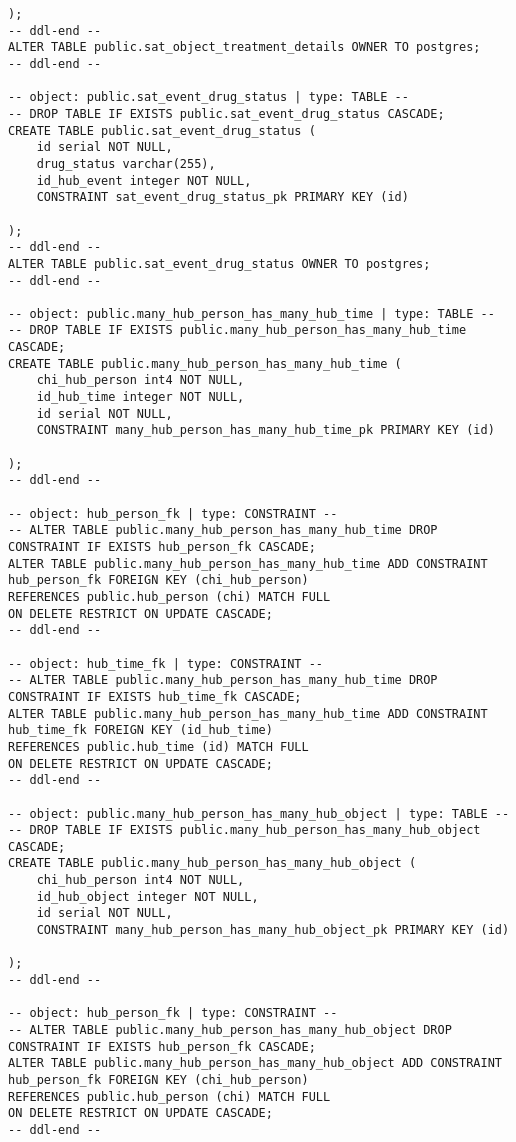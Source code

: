 \begin{lstlisting}
);
-- ddl-end --
ALTER TABLE public.sat_object_treatment_details OWNER TO postgres;
-- ddl-end --

-- object: public.sat_event_drug_status | type: TABLE --
-- DROP TABLE IF EXISTS public.sat_event_drug_status CASCADE;
CREATE TABLE public.sat_event_drug_status (
	id serial NOT NULL,
	drug_status varchar(255),
	id_hub_event integer NOT NULL,
	CONSTRAINT sat_event_drug_status_pk PRIMARY KEY (id)

);
-- ddl-end --
ALTER TABLE public.sat_event_drug_status OWNER TO postgres;
-- ddl-end --

-- object: public.many_hub_person_has_many_hub_time | type: TABLE --
-- DROP TABLE IF EXISTS public.many_hub_person_has_many_hub_time CASCADE;
CREATE TABLE public.many_hub_person_has_many_hub_time (
	chi_hub_person int4 NOT NULL,
	id_hub_time integer NOT NULL,
	id serial NOT NULL,
	CONSTRAINT many_hub_person_has_many_hub_time_pk PRIMARY KEY (id)

);
-- ddl-end --

-- object: hub_person_fk | type: CONSTRAINT --
-- ALTER TABLE public.many_hub_person_has_many_hub_time DROP CONSTRAINT IF EXISTS hub_person_fk CASCADE;
ALTER TABLE public.many_hub_person_has_many_hub_time ADD CONSTRAINT hub_person_fk FOREIGN KEY (chi_hub_person)
REFERENCES public.hub_person (chi) MATCH FULL
ON DELETE RESTRICT ON UPDATE CASCADE;
-- ddl-end --

-- object: hub_time_fk | type: CONSTRAINT --
-- ALTER TABLE public.many_hub_person_has_many_hub_time DROP CONSTRAINT IF EXISTS hub_time_fk CASCADE;
ALTER TABLE public.many_hub_person_has_many_hub_time ADD CONSTRAINT hub_time_fk FOREIGN KEY (id_hub_time)
REFERENCES public.hub_time (id) MATCH FULL
ON DELETE RESTRICT ON UPDATE CASCADE;
-- ddl-end --

-- object: public.many_hub_person_has_many_hub_object | type: TABLE --
-- DROP TABLE IF EXISTS public.many_hub_person_has_many_hub_object CASCADE;
CREATE TABLE public.many_hub_person_has_many_hub_object (
	chi_hub_person int4 NOT NULL,
	id_hub_object integer NOT NULL,
	id serial NOT NULL,
	CONSTRAINT many_hub_person_has_many_hub_object_pk PRIMARY KEY (id)

);
-- ddl-end --

-- object: hub_person_fk | type: CONSTRAINT --
-- ALTER TABLE public.many_hub_person_has_many_hub_object DROP CONSTRAINT IF EXISTS hub_person_fk CASCADE;
ALTER TABLE public.many_hub_person_has_many_hub_object ADD CONSTRAINT hub_person_fk FOREIGN KEY (chi_hub_person)
REFERENCES public.hub_person (chi) MATCH FULL
ON DELETE RESTRICT ON UPDATE CASCADE;
-- ddl-end --


\end{lstlisting}
